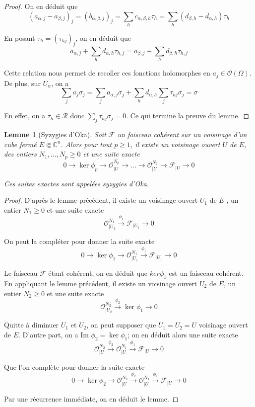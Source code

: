 \documentclass{article}
\newtheorem{lemme}[theoreme]{Lemme}
\theoremstyle{definition}
\theoremstyle{remarque}
\begin{document}
\begin{proof}
On en déduit que $$(a_{\alpha,j} - a_{\beta,j})_j = (b_{\alpha,\beta,j})_j = \sum_h c_{\alpha,\beta,h}\tau_h = \sum_h (d_{\beta, h} - d_{\alpha,h})\tau_h$$

En posant $\tau_h = (\tau_{hj})_j$, on en déduit que
$$a_{\alpha,j} + \sum_h d_{\alpha,h}\tau_{h, j} = a_{\beta,j} + \sum_h d_{\beta,h}\tau_{h, j}$$

Cette relation nous permet de recoller ces fonctions holomorphes en $a_j \in \mathcal{O}(\Omega)$. De plus, sur $U_\alpha$, on a
$$\sum_j a_j\sigma_j = \sum_j a_{\alpha,j}\sigma_j + \sum_h d_{\alpha,h}\sum_j \tau_{hj}\sigma_j = \sigma$$

En effet, on a $\tau_h \in \mathcal{R}$ donc $\sum_j \tau_{hj}\sigma_j = 0$. Ce qui termine la preuve du lemme.
\end{proof}

\begin{lemme}[Syzygies d'Oka]
Soit $\mathcal{F}$ un faisceau cohérent sur un voisinage d'un cube fermé $E \Subset \mathbb{C}^n$. Alors pour tout $p \geq 1$, il existe un voisinage ouvert $U$ de $E$, des entiers $N_1,...,N_p \geq 0$ et une suite exacte
$$0 \to \ker \phi_p \to \mathcal{O}^{N_p}_{|U} \to ... \to \mathcal{O}^{N_1}_{|U} \to \mathcal{F}_{|U} \to 0$$

Ces suites exactes sont appelées syzygies d'Oka.
\end{lemme}

\begin{proof}
D'après le lemme précédent, il existe un voisinage ouvert $U_1$ de $E$ , un entier $N_1 \geq 0$ et une suite exacte
$$\mathcal{O}^{N_1}_{|U_1} \overset{\phi_1}{\to} \mathcal{F}_{|U_1} \to 0$$

On peut la compléter pour donner la suite exacte
$$0 \to \ker \phi_1 \to \mathcal{O}^{N_1}_{|U_1} \overset{\phi_1}{\to} \mathcal{F}_{|U_1} \to 0$$

Le faisceau $\mathcal{F}$ étant cohérent, on en déduit que $ker \phi_1$ est un faisceau cohérent. En appliquant le lemme précédent, il existe un voisinage ouvert $U_2$ de $E$, un entier $N_2 \geq 0$ et une suite exacte
$$\mathcal{O}^{N_2}_{|U_2} \overset{\phi_2}{\to} \ker \phi_1 \to 0$$

Quitte à diminuer $U_1$ et $U_2$, on peut supposer que $U_1 = U_2 = U$ voisinage ouvert de $E$. D'autre part, on a Im $\phi_2 = \ker \phi_1$; on en déduit alors une suite exacte
$$\mathcal{O}^{N_2}_{|U} \overset{\phi_2}{\to} \mathcal{O}^{N_1}_{|U} \overset{\phi_1}{\to} \mathcal{F}_{|U} \to 0$$

Que l'on complète pour donner la suite exacte
$$0 \to \ker \phi_2 \to \mathcal{O}^{N_2}_{|U} \overset{\phi_2}{\to} \mathcal{O}^{N_1}_{|U} \overset{\phi_1}{\to} \mathcal{F}_{|U} \to 0$$

Par une récurrence immédiate, on en déduit le lemme.
\end{proof}
\end{document}
